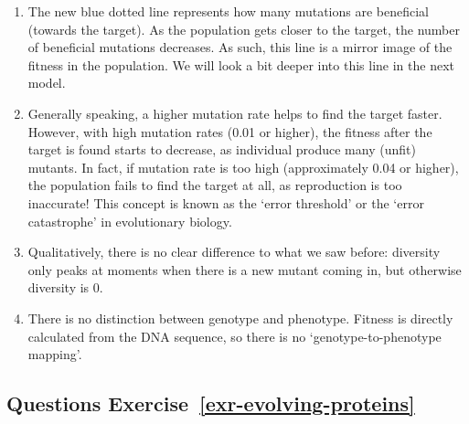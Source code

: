 \documentclass[
  letterpaper,
  DIV=11,
  numbers=noendperiod]{scrreprt}
\providecommand{\tightlist}{%
  \setlength{\itemsep}{0pt}\setlength{\parskip}{0pt}}\usepackage{longtable,booktabs,array}
\theoremstyle{definition}
\theoremstyle{remark}
\begin{document}
\begin{enumerate}
\def\labelenumi{\alph{enumi}.}
\tightlist
\item
  The new blue dotted line represents how many mutations are beneficial
  (towards the target). As the population gets closer to the target, the
  number of beneficial mutations decreases. As such, this line is a
  mirror image of the fitness in the population. We will look a bit
  deeper into this line in the next model.
\item
  Generally speaking, a higher mutation rate helps to find the target
  faster. However, with high mutation rates (0.01 or higher), the
  fitness after the target is found starts to decrease, as individual
  produce many (unfit) mutants. In fact, if mutation rate is too high
  (approximately 0.04 or higher), the population fails to find the
  target at all, as reproduction is too inaccurate! This concept is
  known as the `error threshold' or the `error catastrophe' in
  evolutionary biology.
\item
  Qualitatively, there is no clear difference to what we saw before:
  diversity only peaks at moments when there is a new mutant coming in,
  but otherwise diversity is 0.
\item
  There is no distinction between genotype and phenotype. Fitness is
  directly calculated from the DNA sequence, so there is no
  `genotype-to-phenotype mapping'.
\end{enumerate}

\subsection{\texorpdfstring{Questions
Exercise~\ref{exr-evolving-proteins}}{Questions Exercise~}}\label{questions-exr-evolving-proteins}
\end{document}
